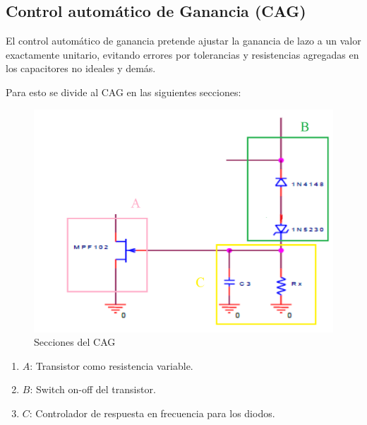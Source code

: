 \documentclass[../../tc_tp6_main.tex]{subfiles}
\begin{document}
\subsection{Control automático de Ganancia (CAG)}
\label{cag}
	El control automático de ganancia pretende ajustar la ganancia de lazo a un valor exactamente unitario, evitando errores por tolerancias y resistencias agregadas en los capacitores no ideales y demás.\par
	Para esto se divide al CAG en las siguientes secciones:
	
	\begin{figure}[H]	
	\centering
	\includegraphics[scale=0.5]{imagenes/cag.png}
	\caption{Secciones del CAG}
	\label{fig:ej1_cag}
\end{figure}

\begin{enumerate}
\item $A$: Transistor como resistencia variable.
\item $B$: Switch on-off del transistor.  
\item $C$: Controlador de respuesta en frecuencia para los diodos.

\end{enumerate}
\end{document}

